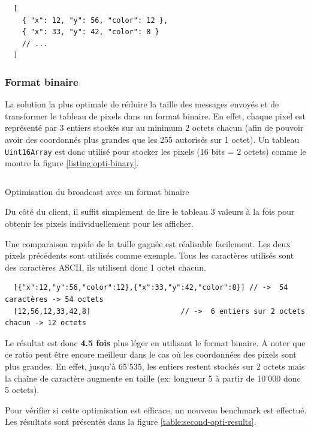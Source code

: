 \begin{verbatim}
  [
    { "x": 12, "y": 56, "color": 12 },
    { "x": 33, "y": 42, "color": 8 }
    // ...
  ]
\end{verbatim}

\subsubsection{Format binaire}

La solution la plus optimale de réduire la taille des messages envoyés et de transformer le tableau de pixels dans un format binaire. En effet, chaque pixel est représenté par 3 entiers stockés sur au minimum 2 octets chacun (afin de pouvoir avoir des coordonnés plus grandes que les 255 autorisés sur 1 octet). Un tableau \texttt{Uint16Array} est donc utilisé pour stocker les pixels (16 bits = 2 octets) comme le montre la figure \ref{listing:opti-binary}.

\begin{listing}[H]
  \inputminted[highlightlines={9}]{ts}{assets/figures/opti-binary.ts}
  \caption{Optimisation du broadcast avec un format binaire}
  \label{listing:opti-binary}
\end{listing}

Du côté du client, il suffit simplement de lire le tableau 3 valeurs à la fois pour obtenir les pixels individuellement pour les afficher.

Une comparaison rapide de la taille gagnée est réalisable facilement. Les deux pixels précédents sont utilisés comme exemple. Tous les caractères utilisés sont des caractères ASCII, ils utilisent donc 1 octet chacun.

\begin{verbatim}
  [{"x":12,"y":56,"color":12},{"x":33,"y":42,"color":8}] // ->  54 caractères -> 54 octets
  [12,56,12,33,42,8]                     // ->  6 entiers sur 2 octets chacun -> 12 octets
\end{verbatim}

Le résultat est donc \textbf{4.5 fois} plus léger en utilisant le format binaire. A noter que ce ratio peut être encore meilleur dans le cas où les coordonnées des pixels sont plus grandes. En effet, jusqu'à 65'535, les entiers restent stockés sur 2 octets mais la chaîne de caractère augmente en taille (ex: longueur 5 à partir de 10'000 donc 5 octets).

Pour vérifier si cette optimisation est efficace, un nouveau benchmark est effectué. Les résultats sont présentés dans la figure \ref{table:second-opti-results}.


